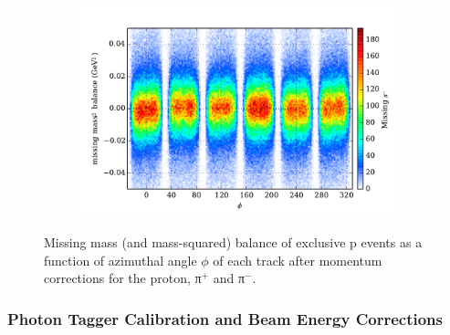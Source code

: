 \begin{figure}
\begin{center}
\begin{subfigure}{0.4\columnwidth}
    \includegraphics[width=\columnwidth]{figures/pcor/pcor_mpimbal.pdf}
\end{subfigure}
\caption[Momentum Balance Before Corrections]{\label{fig:mmbal}Missing mass (and mass-squared) balance of exclusive p \π[+] \π[-] events as a function of azimuthal angle $\phi$ of each track after momentum corrections for the proton, π$^+$ and π$^-$.}
\end{center}\end{figure}



\FloatBarrier


\subsubsection{Photon Tagger Calibration and Beam Energy Corrections}

